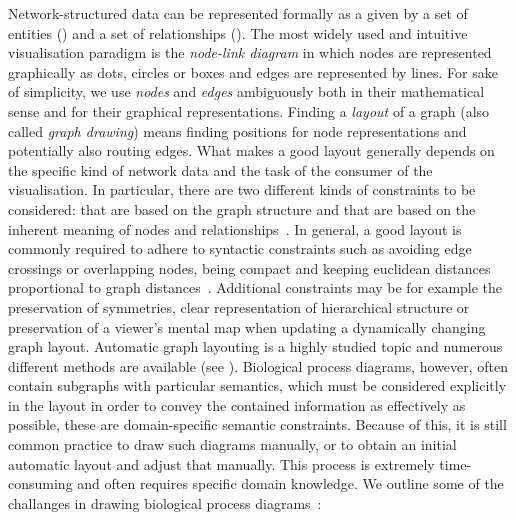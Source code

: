 \documentclass[
	fontsize=10pt, %
	twoside=true, %
	secnumdepth=1, %
  toc=indentunnumbered %
]{kaobook}
\begin{document}
Network-structured data can be represented formally as a  given by a
set of entities () and a set of relationships ().
%
The most widely used and intuitive visualisation paradigm is the
\textit{node-link diagram} in which nodes are represented graphically as dots,
circles or boxes and edges are represented by lines. For sake of simplicity, we
use \textit{nodes} and \textit{edges} ambiguously both in their mathematical
sense and for their graphical representations.
%
Finding a \textit{layout} of a graph (also called \textit{graph drawing}) means
finding positions for node representations and potentially also routing edges.
%
What makes a good layout generally depends on the specific kind of network data
and the task of the consumer of the visualisation. In particular, there are two
different kinds of constraints to be considered: 
that are based on the graph structure and  that are
based on the inherent meaning of nodes and
relationships~\cite{coleman_AestheticsbasedGraphLayout_1996}.
%
In general, a good layout is commonly required to adhere to syntactic
constraints such as avoiding edge crossings or overlapping nodes, being compact
and keeping euclidean distances proportional to graph
distances~\cite{coleman_AestheticsbasedGraphLayout_1996}. Additional constraints
may be for example the preservation of symmetries, clear representation of
hierarchical structure or preservation of a viewer's mental map when updating a
dynamically changing graph layout.
%
Automatic graph layouting is a highly studied topic and numerous different
methods are available (see ).
%
Biological process diagrams, however, often contain subgraphs with particular
semantics, which must be considered explicitly in the layout in order to convey
the contained information as effectively as possible, these are domain-specific
semantic constraints. Because of this, it is still common practice to draw such
diagrams manually, or to obtain an initial automatic layout and adjust that
manually. This process is extremely time-consuming and often requires specific
domain knowledge. We outline some of the challanges in drawing biological
process diagrams~\cite{bourqui_MetabolicNetworkVisualization_2007,
  siebenhaller_HumanlikeLayoutAlgorithms_2020,
  wu_MetabopolisScalableNetwork_2019,
  lambert_PathwayPreservingRepresentation_2011}:

\end{document}
